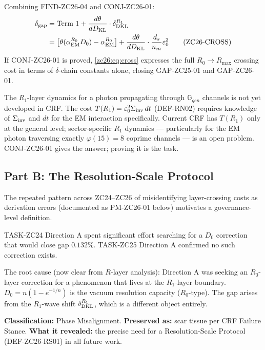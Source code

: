 \documentclass[12pt, a4paper]{article}
\begin{document}
\begin{derivedbox}[title={FIND-ZC26-03: Crossing Cost Fully
  Expressed}]
Combining FIND-ZC26-04 and CONJ-ZC26-01:
\begin{align}
  \delta_{\rm gap}
  &= \text{Term~1} + \frac{d\theta}{dD_{\rm KL}}\cdot\delta_{\rm DKL}^{R_1}
  \notag\\
  &= \bigl[\theta(\alpha_{\rm EM}^{R_0} D_0) - \alpha_{\rm EM}^{R_0}\bigr]
    + \frac{d\theta}{dD_{\rm KL}}\cdot\frac{d_s}{n_m}\varepsilon_0^2
  \tag{ZC26-CROSS}\label{zc26:eq:cross}
\end{align}
If CONJ-ZC26-01 is proved, \eqref{zc26:eq:cross} expresses the full
$R_0\to R_{\max}$ crossing cost in terms of $\delta$-chain
constants alone, closing GAP-ZC25-01 and GAP-ZC26-01.
\end{derivedbox}

\begin{derivedbox}[title={FIND-ZC26-05: Term~2 Requires
  New $R_1$ Theory}]
The $R_1$-layer dynamics for a photon propagating through
$\mathbb{G}_{gen}$ channels is not yet developed in CRF.
The cost $T(R_1) = \varepsilon_0^2\Sigma_{\rm inv}\,dt$
(DEF-RN02) requires knowledge of $\Sigma_{\rm inv}$ and $dt$
for the EM interaction specifically.
Current CRF has $T(R_1)$ only at the general level;
sector-specific $R_1$ dynamics --- particularly for the
EM photon traversing exactly $\varphi(15) = 8$ coprime channels
--- is an open problem. CONJ-ZC26-01 gives the answer;
proving it is the task.
\end{derivedbox}

\subsection{Part B: The Resolution-Scale Protocol}
\label{zc26:sec:protocol}

The repeated pattern across ZC24--ZC26 of misidentifying
layer-crossing costs as derivation errors (documented as
PM-ZC26-01 below) motivates a governance-level definition.

\begin{keybox}[title={PM-ZC26-01: ZC24 Direction A Was a
  Wrong-Layer Search (Phase Misalignment)}]
TASK-ZC24 Direction A spent significant effort searching for a
$D_0$ correction that would close gap $0.132\%$.
TASK-ZC25 Direction A confirmed no such correction exists.

The root cause (now clear from $R$-layer analysis):
Direction A was seeking an $R_0$-layer correction for a
phenomenon that lives at the $R_1$-layer boundary.
$D_0 = n(1-e^{-1/n})$ is the vacuum resolution capacity
($R_0$-type). The gap arises from the $R_1$-wave shift
$\delta_{\rm DKL}^{R_1}$, which is a different object entirely.

\medskip
\textbf{Classification:} Phase Misalignment.
\textbf{Preserved as:} scar tissue per CRF Failure Stance.
\textbf{What it revealed:} the precise need for a
Resolution-Scale Protocol (DEF-ZC26-RS01) in all future work.
\end{keybox}
\end{document}
